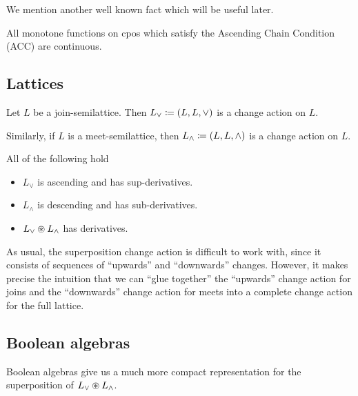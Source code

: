 We mention another well known fact which will be useful later.

\begin{prop}
\label{prop:monotoneContinuous}
  All monotone functions on cpos which satisfy the Ascending Chain Condition
  (ACC) are continuous.
\end{prop}

\subsection{Lattices}

\begin{defn}
  Let $L$ be a join-semilattice. Then $L_\vee \coloneqq (L,L,\vee)$ is a change
  action on $L$.

  Similarly, if $L$ is a meet-semilattice, then $L_\wedge \coloneqq (L,L,\wedge)$ is a change
  action on $L$.
\end{defn}

\begin{prop}
  All of the following hold
  \begin{itemize}
    \item $L_\vee$ is ascending and has sup-derivatives.
    \item $L_\wedge$ is descending and has sub-derivatives.
    \item $L_\vee \circledast L_\wedge$ has derivatives.
  \end{itemize}
\end{prop}

As usual, the superposition change action is difficult to work with, since it
consists of sequences of ``upwards'' and ``downwards'' changes. However, it
makes precise the intuition that we can ``glue together'' the ``upwards'' change
action for joins and the ``downwards'' change action for meets into a
complete change action for the full lattice.

\subsection{Boolean algebras}

Boolean algebras give us a much more compact representation for the
superposition of $L_\vee \circledast L_\wedge$.

